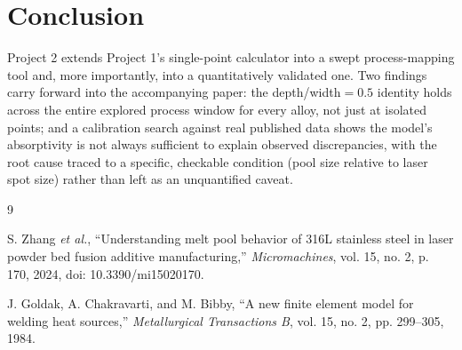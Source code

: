 \documentclass[10pt,journal]{IEEEtran}
\begin{document}
\section{Conclusion}

Project 2 extends Project 1's single-point calculator into a swept process-mapping tool and, more importantly, into a quantitatively validated one. Two findings carry forward into the accompanying paper: the depth/width$=0.5$ identity holds across the entire explored process window for every alloy, not just at isolated points; and a calibration search against real published data shows the model's absorptivity is not always sufficient to explain observed discrepancies, with the root cause traced to a specific, checkable condition (pool size relative to laser spot size) rather than left as an unquantified caveat.

\begin{thebibliography}{9}

S. Zhang \textit{et al.}, ``Understanding melt pool behavior of 316L stainless steel in laser powder bed fusion additive manufacturing,'' \textit{Micromachines}, vol. 15, no. 2, p. 170, 2024, doi: 10.3390/mi15020170.

J. Goldak, A. Chakravarti, and M. Bibby, ``A new finite element model for welding heat sources,'' \textit{Metallurgical Transactions B}, vol. 15, no. 2, pp. 299--305, 1984.

\end{thebibliography}
\end{document}
